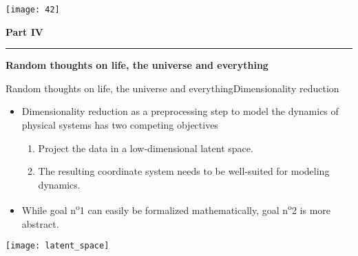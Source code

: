 \begin{frame}[t, c]{}{}
  \begin{minipage}{.48\textwidth}
    \centering
    \texttt{[image: 42]}
  \end{minipage}%
  \hfill
  \begin{minipage}{.48\textwidth}
    \centering
    {
      \Large\textbf{Part IV}
    }
    
    \bigskip
    
    \rule{\textwidth}{0.001\textwidth}
    
    \bigskip
    
    {
      \large
      \textbf{Random thoughts on life, the universe and everything}
    }
    
  \end{minipage}
\end{frame}

\begin{frame}[t, c]{Random thoughts on life, the universe and everything}{Dimensionality reduction}
  \begin{minipage}{.68\textwidth}
    \begin{itemize}
    \item Dimensionality reduction as a preprocessing step to model the dynamics of physical systems has two competing objectives
      \begin{enumerate}
      \item Project the data in a low-dimensional latent space.
      \item The resulting coordinate system needs to be well-suited for modeling dynamics.
      \end{enumerate}
      
      \medskip
      
    \item While goal n\textsuperscript{o}1 can easily be formalized mathematically, goal n\textsuperscript{o}2 is more abstract.
    \end{itemize}
  \end{minipage}%
  \hfill
  \begin{minipage}{.28\textwidth}
    \centering
    \texttt{[image: latent\_space]}
  \end{minipage}
  
  \vspace{1cm}
\end{frame}

